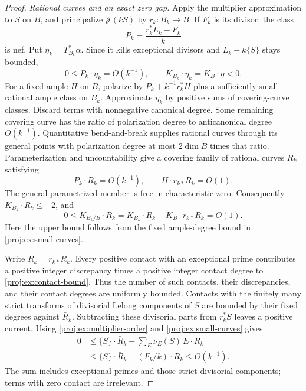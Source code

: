 \documentclass[11pt,letterpaper]{article}
\theoremstyle{definition}
\theoremstyle{remark}
\begin{document}
\begin{proof}
 
 \emph{Rational curves and an exact zero gap.}
Apply the multiplier approximation to \(S\) on \(B\), and
principalize \(\mathcal J(kS)\) by \(r_k:B_k\to B\).
If \(F_k\) is its divisor, the class
\[
 P_k=\frac{r_k^*L_k-F_k}{k}
\]
is nef. Put \(\eta_k=T_{B_k}^*\alpha\). Since it kills
exceptional divisors and \(L_k-k\{S\}\) stays bounded,
\[
 0\leq P_k\cdot\eta_k=O(k^{-1}),\qquad
 K_{B_k}\cdot\eta_k=K_B\cdot\eta<0.
\]
For a fixed ample \(H\) on \(B\), polarize by
\(P_k+k^{-1}r_k^*H\) plus a sufficiently small rational ample
class on \(B_k\). Approximate \(\eta_k\) by positive sums of
covering-curve classes. Discard terms with nonnegative
canonical degree. Some remaining covering curve has the ratio
of polarization degree to anticanonical degree \(O(k^{-1})\).
Quantitative bend-and-break
\cite[Theorem~5]{Proj-MiyaokaMori1986} supplies rational curves
through its general points with polarization degree at most
\(2\dim B\) times that ratio. Parameterization and
uncountability give a covering family of rational curves
\(R_k\) satisfying
\begin{equation}\label{proj:ex:small-curves}
 P_k\cdot R_k=O(k^{-1}),\qquad
 H\cdot r_{k*}R_k=O(1).
\end{equation}
The general parametrized member is free in characteristic
zero. Consequently \(K_{B_k}\cdot R_k\leq-2\), and
\begin{equation}\label{proj:ex:contact-bound}
 0\leq K_{B_k/B}\cdot R_k
   =K_{B_k}\cdot R_k-K_B\cdot r_{k*}R_k=O(1).
\end{equation}
Here the upper bound follows from the fixed ample-degree
bound in \eqref{proj:ex:small-curves}.

Write \(\bar R_k=r_{k*}R_k\). Every positive contact with an
exceptional prime contributes a positive integer discrepancy
times a positive integer contact degree to
\eqref{proj:ex:contact-bound}. Thus the number of such contacts,
their discrepancies, and their contact degrees are uniformly
bounded. Contacts with the finitely many strict transforms
of divisorial Lelong components of \(S\) are bounded by their
fixed degrees against \(\bar R_k\). Subtracting these
divisorial parts from \(r_k^*S\) leaves a positive current.
Using \eqref{proj:ex:multiplier-order} and
\eqref{proj:ex:small-curves} gives
\begin{equation}\label{proj:ex:zero-gap}
 \begin{split}
 0&\leq \{S\}\cdot\bar R_k
          -\sum_E\nu_E(S)\,E\cdot R_k\\
  &\leq \{S\}\cdot\bar R_k-(F_k/k)\cdot R_k
   \leq O(k^{-1}).
 \end{split}
\end{equation}
The sum includes exceptional primes and those strict
divisorial components; terms with zero contact are irrelevant.


\end{proof}
\end{document}
